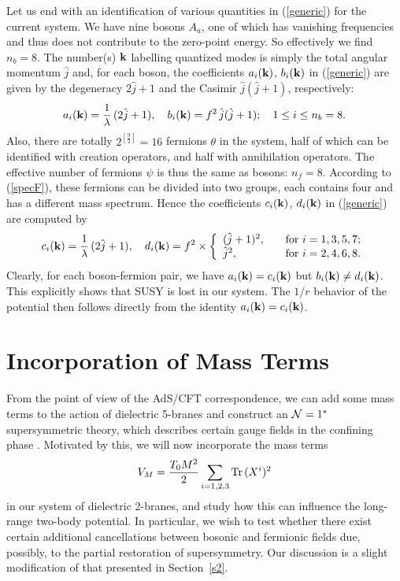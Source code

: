 \documentclass[a4paper,12pt]{article}
\begin{document}
{Let us end with an identification of various quantities in (\ref{generic}) for the current system. We have nine bosons $A_{a}$, one of which has vanishing frequencies and thus does not contribute to the zero-point energy. So effectively we find $n_{b}=8$. The number(s) $\bf k$ labelling quantized modes is simply the total angular momentum $\hat{j}$ and, for each boson, the coefficients $a_{i}({\bf k})$, $b_{i}({\bf k})$ in (\ref{generic}) are given by the degeneracy $2\hat{j}+1$ and the Casimir $\hat{j}(\hat{j}+1)$, respectively:
\begin{equation}
a_{i}({\bf k})=\frac{1}{\lambda}\,(2\hat{j}+1),\quad
b_{i}({\bf k})=f^{2}\,\hat{j}(\hat{j}+1);\quad 1\leq i\leq n_{b}=8.
\label{ab}
\end{equation}
Also, there are totally $2^{\left[\frac{9}{2}\right]}=16$ fermions $\theta$ in the system, half of which can be identified with creation operators, and half with annihilation operators. The effective number of fermions $\psi$ is thus the same as bosons: $n_{f}=8$. According to (\ref{specF}), these fermions can be divided into two groups, each contains four and has a different mass spectrum. Hence the coefficients $c_{i}({\bf k})$, $d_{i}({\bf k})$ in (\ref{generic}) are computed by
\begin{equation}
c_{i}({\bf k})=\frac{1}{\lambda}\,(2\hat{j}+1),\quad
d_{i}({\bf k})=f^{2}\times\left\{
                \begin{array}{ll}
                   (\hat{j}+1)^{2},\quad  & \hbox{for $i=1,3,5,7$;}\\
                    \hat{j}^{2}, & \hbox{for $i=2,4,6,8$.}
                \end{array}                  
\right.
\label{cd}
\end{equation}
Clearly, for each boson-fermion pair, we have $a_{i}({\bf k})=c_{i}({\bf k})$ but $b_{i}({\bf k})\neq d_{i}({\bf k})$. This explicitly shows that SUSY is lost in our system. The $1/r$ behavior of the potential then follows directly from the identity $a_{i}({\bf k})=c_{i}({\bf k})$.
\section{Incorporation of Mass Terms} \label{s3}
From the point of view of the AdS/CFT correspondence, we can add some mass terms to the action of dielectric 5-branes and construct an ${\cal N}=1^{*}$ supersymmetric theory, which describes certain gauge fields in the confining phase \cite{PS}. Motivated by this, we will now incorporate the mass terms
\begin{equation}
V_{M}=\frac{T_{0}M^{2}}{2}\sum_{i=1,2,3}{\rm Tr}\,(X^{i})^{2}
\label{mass}
\end{equation}
in our system of dielectric 2-branes, and study how this can influence the long-range two-body potential. In particular, we wish to test whether there exist certain additional cancellations between bosonic and fermionic fields due, possibly, to the partial restoration of supersymmetry. Our discussion is a slight modification of that presented in Section~\ref{s2}.

}
\end{document}
